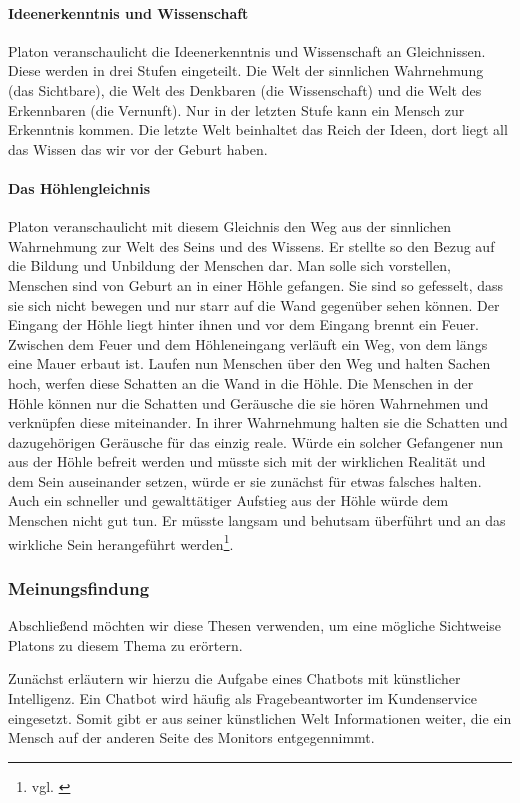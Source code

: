 \paragraph{Ideenerkenntnis und Wissenschaft}
Platon veranschaulicht die Ideenerkenntnis und Wissenschaft an Gleichnissen. Diese werden in drei Stufen eingeteilt. Die Welt der sinnlichen Wahrnehmung (das Sichtbare), die Welt des Denkbaren (die Wissenschaft) und die Welt des Erkennbaren (die Vernunft). Nur in der letzten Stufe kann ein Mensch zur Erkenntnis kommen. Die letzte Welt beinhaltet das Reich der Ideen, dort liegt all das Wissen das wir vor der Geburt haben.

\paragraph{Das Höhlengleichnis}
Platon veranschaulicht mit diesem Gleichnis den Weg aus der sinnlichen Wahrnehmung zur Welt des Seins und des Wissens. Er stellte so den Bezug auf die Bildung und Unbildung der Menschen dar.
Man solle sich vorstellen,  Menschen sind von Geburt an in einer Höhle gefangen. Sie sind so gefesselt, dass sie sich nicht bewegen und nur starr auf die Wand gegenüber sehen können. Der Eingang der Höhle liegt hinter ihnen und vor dem Eingang brennt ein Feuer. Zwischen dem Feuer und dem Höhleneingang verläuft ein Weg, von dem längs eine Mauer erbaut ist. Laufen nun Menschen über den Weg und halten Sachen hoch, werfen diese Schatten an die Wand in die Höhle. Die Menschen in der Höhle können nur die Schatten und Geräusche die sie hören Wahrnehmen und verknüpfen diese miteinander. In ihrer Wahrnehmung halten sie die Schatten und dazugehörigen Geräusche für das einzig reale. Würde ein solcher Gefangener nun aus der Höhle befreit werden und müsste sich mit der wirklichen Realität und dem Sein auseinander setzen, würde er sie zunächst für etwas falsches halten. Auch ein schneller und gewalttätiger Aufstieg aus der Höhle würde dem Menschen nicht gut tun. Er müsste langsam und behutsam überführt und an das wirkliche Sein herangeführt werden\footnote{vgl. \cite{Politeia} }.    
	
\subsubsection{Meinungsfindung}
Abschließend möchten wir diese Thesen verwenden, um eine mögliche Sichtweise Platons zu diesem Thema zu erörtern.

Zunächst erläutern wir hierzu die Aufgabe eines Chatbots mit künstlicher Intelligenz. Ein Chatbot wird häufig als Fragebeantworter im Kundenservice eingesetzt. Somit gibt er aus seiner künstlichen Welt Informationen weiter, die ein Mensch auf der anderen Seite des Monitors entgegennimmt.


